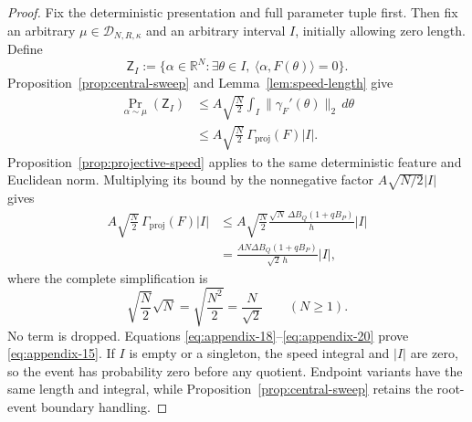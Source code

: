 \begin{proof}
Fix the deterministic presentation and full parameter tuple first.  Then fix
an arbitrary $\mu\in\mathcal D_{N,R,\kappa}$ and an arbitrary interval $I$,
initially allowing zero length.  Define
\[
\mathsf Z_I:=\{\alpha\in\mathbb R^N:\exists\theta\in I,
 \ \langle\alpha,F(\theta)\rangle=0\}.
\]
Proposition~\ref{prop:central-sweep} and
Lemma~\ref{lem:speed-length} give
\begin{equation}
\begin{aligned}
\Pr_{\alpha\sim\mu}(\mathsf Z_I)
&\leq A\sqrt{\frac N2}
 \int_I\|\gamma_F'(\theta)\|_2\,d\theta\\
&\leq A\sqrt{\frac N2}\,
 \Gamma_{\mathrm{proj}}(F)|I|.
\end{aligned}
\label{eq:appendix-18}
\end{equation}
Proposition~\ref{prop:projective-speed} applies to the same deterministic
feature and Euclidean norm.  Multiplying its bound by the nonnegative factor
$A\sqrt{N/2}|I|$ gives
\begin{equation}
\begin{aligned}
A\sqrt{\frac N2}\,\Gamma_{\mathrm{proj}}(F)|I|
&\leq A\sqrt{\frac N2}
 \frac{\sqrt N\,\Delta B_Q(1+qB_P)}h|I|\\
&=\frac{AN\Delta B_Q(1+qB_P)}{\sqrt2\,h}|I|,
\end{aligned}
\label{eq:appendix-19}
\end{equation}
where the complete simplification is
\begin{equation}
\sqrt{\frac N2}\sqrt N
=\sqrt{\frac{N^2}{2}}
=\frac N{\sqrt2}
\qquad(N\geq1).
\label{eq:appendix-20}
\end{equation}
No term is dropped.  Equations \eqref{eq:appendix-18}--\eqref{eq:appendix-20} prove \eqref{eq:appendix-15}.  If $I$ is
empty or a singleton, the speed integral and $|I|$ are zero, so the event has
probability zero before any quotient.  Endpoint variants have the same
length and integral, while Proposition~\ref{prop:central-sweep} retains the
root-event boundary handling.


\end{proof}
